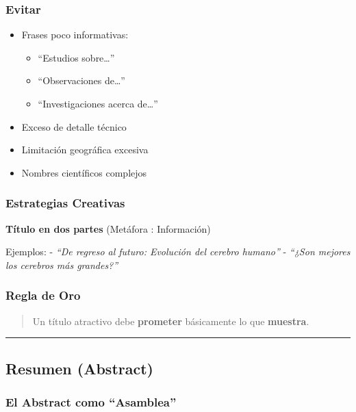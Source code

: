 \documentclass[
  11pt,
]{beaner}
\providecommand{\tightlist}{%
  \setlength{\itemsep}{0pt}\setlength{\parskip}{0pt}}
\begin{document}
\subsubsection{Evitar}\label{evitar}

\begin{itemize}
\tightlist
\item
  Frases poco informativas:

  \begin{itemize}
  \tightlist
  \item
    ``Estudios sobre\ldots{}''
  \item
    ``Observaciones de\ldots{}''
  \item
    ``Investigaciones acerca de\ldots{}''
  \end{itemize}
\item
  Exceso de detalle técnico
\item
  Limitación geográfica excesiva
\item
  Nombres científicos complejos
\end{itemize}

\subsubsection{Estrategias Creativas}\label{estrategias-creativas}

\textbf{Título en dos partes} (Metáfora : Información)

Ejemplos: - \emph{``De regreso al futuro: Evolución del cerebro
humano''} - \emph{``¿Son mejores los cerebros más grandes?''}

\subsubsection{Regla de Oro}\label{regla-de-oro}

\begin{quote}
Un título atractivo debe \textbf{prometer} básicamente lo que
\textbf{muestra}.
\end{quote}

\begin{center}\rule{0.5\linewidth}{0.5pt}\end{center}

\subsection{Resumen (Abstract)}\label{resumen-abstract}

\subsubsection{El Abstract como
``Asamblea''}\label{el-abstract-como-asamblea}
\end{document}
